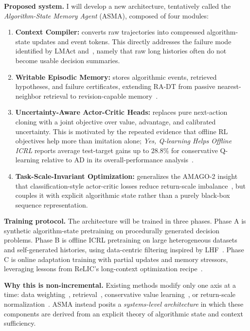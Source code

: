 \documentclass[10pt,twocolumn,letterpaper]{article}
\begin{document}
\textbf{Proposed system.} I will develop a new architecture, tentatively called the \emph{Algorithm-State Memory Agent} (ASMA), composed of four modules:
\begin{enumerate}[leftmargin=1.3em]
\item \textbf{Context Compiler:} converts raw trajectories into compressed algorithm-state updates and event tokens. This directly addresses the failure mode identified by LMAct and~\cite{krishnamurthy2024explore,ruoss2024lmact}, namely that raw long histories often do not become usable decision summaries.
\item \textbf{Writable Episodic Memory:} stores algorithmic events, retrieved hypotheses, and failure certificates, extending RA-DT from passive nearest-neighbor retrieval to revision-capable memory~\cite{schmied2024radt}.
\item \textbf{Uncertainty-Aware Actor-Critic Heads:} replaces pure next-action cloning with a joint objective over value, advantage, and calibrated uncertainty. This is motivated by the repeated evidence that offline RL objectives help more than imitation alone; \emph{Yes, Q-learning Helps Offline ICRL} reports average test-target gains up to \(28.8\%\) for conservative Q-learning relative to AD in its overall-performance analysis~\cite{tarasov2025qlearning}.
\item \textbf{Task-Scale-Invariant Optimization:} generalizes the AMAGO-2 insight that classification-style actor-critic losses reduce return-scale imbalance~\cite{grigsby2024amago2}, but couples it with explicit algorithmic state rather than a purely black-box sequence representation.
\end{enumerate}

\textbf{Training protocol.}
The architecture will be trained in three phases. Phase A is synthetic algorithm-state pretraining on procedurally generated decision problems. Phase B is offline ICRL pretraining on large heterogeneous datasets and self-generated histories, using data-centric filtering inspired by LHF~\cite{chen2025lhf}. Phase C is online adaptation training with partial updates and memory stressors, leveraging lessons from ReLIC's long-context optimization recipe~\cite{elawady2024relic}.

\textbf{Why this is non-incremental.} Existing methods modify only one axis at a time: data weighting~\cite{chen2025lhf}, retrieval~\cite{schmied2024radt}, conservative value learning~\cite{tarasov2025qlearning}, or return-scale normalization~\cite{grigsby2024amago2}. ASMA instead posits a \emph{systems-level architecture} in which these components are derived from an explicit theory of algorithmic state and context sufficiency.
\end{document}
